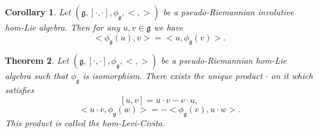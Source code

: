 \documentclass[10pt]{amsart}
\numberwithin{equation}{section}
\newtheorem{theorem}{Theorem}[section]
\newtheorem{corollary}[theorem]{Corollary}
\begin{document}
\begin{corollary}\label{AM350}
	Let $(\mathfrak{g}, [\cdot, \cdot], \phi_\mathfrak{g}, <,>)$ be a pseudo-Riemannian involutive hom-Lie algebra. Then for any $u,v\in\mathfrak{g}$ we have 
	\begin{equation}\label{EL1}
	<\phi_\mathfrak{g}(u), v>=<u, \phi_\mathfrak{g}(v)>.
	\end{equation}
\end{corollary}
\begin{theorem}
Let $(\mathfrak{g}, [\cdot, \cdot], \phi_\mathfrak{g}, <,>)$ be a pseudo-Riemannian hom-Lie algebra such that $\phi_\mathfrak{g}$ is isomorphism. There exists the unique product $\cdot$ on it which satisfies
\begin{equation}\label{SL}
[u,v]=u\cdot v-v\cdot u,
\end{equation}
\begin{equation}\label{L2}
<u\cdot v,{ \phi_\mathfrak{g}}(w)>=-<{ \phi_\mathfrak{g}}(v),u\cdot w>.
\end{equation}
This product is called the hom-Levi-Civita.
\end{theorem}
\end{document}
